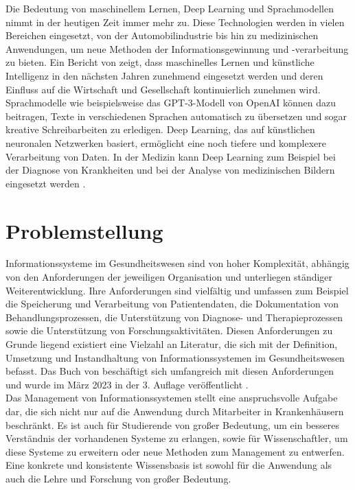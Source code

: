 Die Bedeutung von maschinellem Lernen, Deep Learning und Sprachmodellen nimmt in der heutigen Zeit immer mehr zu. 
Diese Technologien werden in vielen Bereichen eingesetzt, von der Automobilindustrie bis hin zu medizinischen Anwendungen, um neue Methoden der Informationsgewinnung und -verarbeitung zu bieten.
Ein Bericht von \citet{hwwi} zeigt, dass maschinelles Lernen und künstliche Intelligenz in den nächsten Jahren zunehmend eingesetzt werden und deren Einfluss auf die Wirtschaft und Gesellschaft kontinuierlich zunehmen wird.
Sprachmodelle wie beispielsweise das GPT-3-Modell von OpenAI \citep{gpt3} können dazu beitragen, Texte in verschiedenen Sprachen automatisch zu übersetzen und sogar kreative Schreibarbeiten zu erledigen. 
Deep Learning, das auf künstlichen neuronalen Netzwerken basiert, ermöglicht eine noch tiefere und komplexere Verarbeitung von Daten. 
In der Medizin kann Deep Learning zum Beispiel bei der Diagnose von Krankheiten und bei der Analyse von medizinischen Bildern eingesetzt werden \citep{skincancer}.

\section{Problemstellung}\label{sec:problemstellung}
Informationssysteme im Gesundheitswesen sind von hoher Komplexität, abhängig von den Anforderungen der jeweiligen Organisation und unterliegen ständiger Weiterentwicklung.
Ihre Anforderungen sind vielfältig und umfassen zum Beispiel die Speicherung und Verarbeitung von Patientendaten, die Dokumentation von Behandlungsprozessen, die Unterstützung von Diagnose- und Therapieprozessen sowie die Unterstützung von Forschungsaktivitäten.
Diesen Anforderungen zu Grunde liegend existiert eine Vielzahl an Literatur, die sich mit der Definition, Umsetzung und Instandhaltung von Informationssystemen im Gesundheitswesen befasst. 
Das Buch  von  beschäftigt sich umfangreich mit diesen Anforderungen und wurde im März 2023 in der 3. Auflage veröffentlicht \citep{bb}.\\

Das Management von Informationssystemen stellt eine anspruchsvolle Aufgabe dar, die sich nicht nur auf die Anwendung durch Mitarbeiter in Krankenhäusern beschränkt.
Es ist auch für Studierende von großer Bedeutung, um ein besseres Verständnis der vorhandenen Systeme zu erlangen, sowie für Wissenschaftler, um diese Systeme zu erweitern oder neue Methoden zum Management zu entwerfen.
Eine konkrete und konsistente Wissensbasis ist sowohl für die Anwendung als auch die Lehre und Forschung von großer Bedeutung.\\

